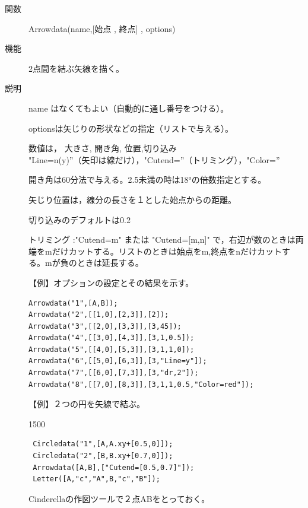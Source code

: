 \documentclass[papersize,a4paper,12pt,uplatex]{jsarticle}
\begin{document}
\begin{description}
\vspace{10mm}

\hypertarget{arrowdata}{}
\item[関数]Arrowdata(name,[始点 , 終点] , options) 
\item[機能]2点間を結ぶ矢線を描く。
\item[説明]name はなくてもよい（自動的に通し番号をつける）。

optionsは矢じりの形状などの指定（リストで与える）。

\hspace*{10mm} 数値は， 大きさ, 開き角, 位置,切り込み\\
\hspace*{10mm} "Line=n(y)''（矢印は線だけ），"Cutend=''（トリミング），"Color=''

開き角は60分法で与える。2.5未満の時は18°の倍数指定とする。

矢じり位置は，線分の長さを１とした始点からの距離。

切り込みのデフォルトは0.2
 
トリミング :"Cutend=m" または "Cutend=[m,n]" で，右辺が数のときは両端をmだけカットする。リストのときは始点をm,終点をnだけカットする。mが負のときは延長する。

\vspace{\baselineskip}
【例】オプションの設定とその結果を示す。

\begin{verbatim}
Arrowdata("1",[A,B]);
Arrowdata("2",[[1,0],[2,3]],[2]);
Arrowdata("3",[[2,0],[3,3]],[3,45]);
Arrowdata("4",[[3,0],[4,3]],[3,1,0.5]);
Arrowdata("5",[[4,0],[5,3]],[3,1,1,0]);
Arrowdata("6",[[5,0],[6,3]],[3,"Line=y"]);
Arrowdata("7",[[6,0],[7,3]],[3,"dr,2"]);
Arrowdata("8",[[7,0],[8,3]],[3,1,1,0.5,"Color=red"]);
\end{verbatim}

\vspace{6mm}

\hspace{20mm}\scalebox{0.9}{}

【例】２つの円を矢線で結ぶ。

\begin{layer}{150}{0}
\end{layer}
\hspace{20mm}

\begin{verbatim}
 Circledata("1",[A,A.xy+[0.5,0]]);
 Circledata("2",[B,B.xy+[0.7,0]]);
 Arrowdata([A,B],["Cutend=[0.5,0.7]"]);
 Letter([A,"c","A",B,"c","B"]);
\end{verbatim}
Cinderellaの作図ツールで２点ABをとっておく。


\end{description}
\end{document}
